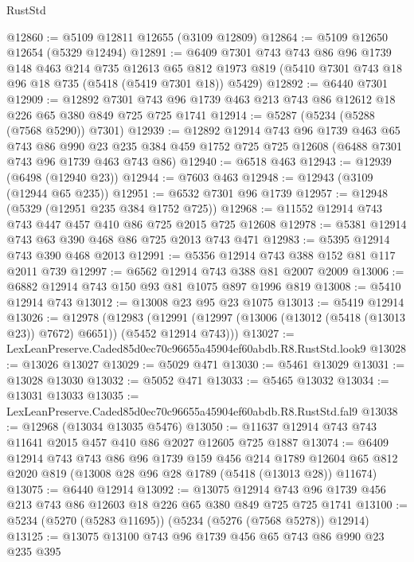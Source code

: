 \begin{lexlean}{RustStd}
\begin{coremodule}
@12860 := @5109 @12811 @12655 (@3109 @12809)
@12864 := @5109 @12650 @12654 (@5329 @12494)
@12891 := @6409
    @7301
    @743
    @743
    @86
    @96
    @1739
    @148
    @463
    @214
    @735
    @12613
    @65
    @812
    @1973
    @819
    (@5410 @7301 @743 @18 @96 @18 @735 (@5418 (@5419 @7301 @18)) @5429)
@12892 := @6440 @7301
@12909 := @12892
    @7301
    @743
    @96
    @1739
    @463
    @213
    @743
    @86
    @12612
    @18
    @226
    @65
    @380
    @849
    @725
    @725
    @1741
@12914 := @5287 (@5234 (@5288 (@7568 @5290)) @7301)
@12939 := @12892
    @12914
    @743
    @96
    @1739
    @463
    @65
    @743
    @86
    @990
    @23
    @235
    @384
    @459
    @1752
    @725
    @725
    @12608
    (@6488 @7301 @743 @96 @1739 @463 @743 @86)
@12940 := @6518 @463
@12943 := @12939 (@6498 (@12940 @23))
@12944 := @7603 @463
@12948 := @12943 (@3109 (@12944 @65 @235))
@12951 := @6532 @7301 @96 @1739
@12957 := @12948 (@5329 (@12951 @235 @384 @1752 @725))
@12968 := @11552 @12914 @743 @743 @447 @457 @410 @86 @725 @2015 @725 @12608
@12978 := @5381 @12914 @743 @63 @390 @468 @86 @725 @2013 @743 @471
@12983 := @5395 @12914 @743 @390 @468 @2013
@12991 := @5356 @12914 @743 @388 @152 @81 @117 @2011 @739
@12997 := @6562 @12914 @743 @388 @81 @2007 @2009
@13006 := @6882 @12914 @743 @150 @93 @81 @1075 @897 @1996 @819
@13008 := @5410 @12914 @743
@13012 := @13008 @23 @95 @23 @1075
@13013 := @5419 @12914
@13026 := @12978
    (@12983
      (@12991 (@12997 (@13006 (@13012 (@5418 (@13013 @23)) @7672) @6651)) (@5452 @12914 @743)))
@13027 := LexLeanPreserve.Caded85d0ec70c96655a45904ef60abdb.R8.RustStd.look9
@13028 := @13026 @13027
@13029 := @5029 @471
@13030 := @5461 @13029
@13031 := @13028 @13030
@13032 := @5052 @471
@13033 := @5465 @13032
@13034 := @13031 @13033
@13035 := LexLeanPreserve.Caded85d0ec70c96655a45904ef60abdb.R8.RustStd.fal9
@13038 := @12968 (@13034 @13035 @5476)
@13050 := @11637 @12914 @743 @743 @11641 @2015 @457 @410 @86 @2027 @12605 @725 @1887
@13074 := @6409
    @12914
    @743
    @743
    @86
    @96
    @1739
    @159
    @456
    @214
    @1789
    @12604
    @65
    @812
    @2020
    @819
    (@13008 @28 @96 @28 @1789 (@5418 (@13013 @28)) @11674)
@13075 := @6440 @12914
@13092 := @13075
    @12914
    @743
    @96
    @1739
    @456
    @213
    @743
    @86
    @12603
    @18
    @226
    @65
    @380
    @849
    @725
    @725
    @1741
@13100 := @5234 (@5270 (@5283 @11695)) (@5234 (@5276 (@7568 @5278)) @12914)
@13125 := @13075
    @13100
    @743
    @96
    @1739
    @456
    @65
    @743
    @86
    @990
    @23
    @235
    @395

\end{coremodule}
\end{lexlean}
